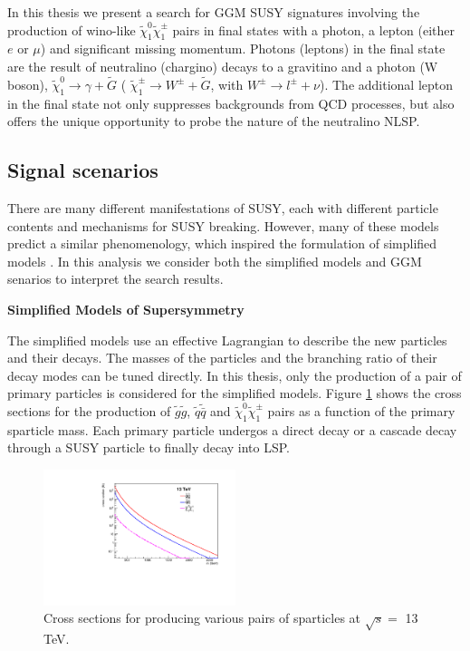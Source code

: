 \documentclass[thesis.tex]{subfiles}
\begin{document}
In this thesis we present a search for GGM SUSY signatures involving the production of wino-like $\tilde{\chi}_1^0\tilde{\chi}_1^\pm$ pairs in final states with a photon, a lepton (either $e$ or $\mu$) and significant missing momentum. 
Photons (leptons) in the final state are the result of neutralino (chargino) decays to a gravitino and a photon (W boson), $\tilde{\chi}_1^0 \rightarrow \gamma + \tilde{G}$ ( $\tilde{\chi}_1^\pm \rightarrow W^\pm+ \tilde{G}$, with $W^\pm \rightarrow l^\pm + \nu$).
The additional lepton in the final state not only suppresses backgrounds from QCD processes, but also offers the unique opportunity to probe the nature of the neutralino NLSP.  

\subsection{Signal scenarios}
There are many different manifestations of SUSY, each with different particle contents and mechanisms for SUSY breaking. 
However, many of these models predict a similar phenomenology, which inspired the formulation of simplified models \cite{SimplifiedModel}.
In this analysis we consider both the simplified models and GGM senarios to interpret the search results. 

\noindent \textbf{Simplified Models of Supersymmetry}

The simplified models use an effective Lagrangian to describe the new particles and their decays. 
The masses of the particles and the branching ratio of their decay modes can be tuned directly. 
In this thesis, only the production of a pair of primary particles is considered for the simplified models. 
Figure \ref{fig:crosssection} shows the cross sections for the production of $\tilde{g}\tilde{g}$, $\tilde{q}\tilde{\bar{q}}$ and $\tilde{\chi}_1^0\tilde{\chi}_1^\pm$ pairs as a function of the primary sparticle mass. 
Each primary particle undergos a direct decay or a cascade decay through a SUSY particle to finally decay into LSP. 

	\begin{figure}[!h]
		\centering
		\includegraphics[width=0.5\textwidth]{plot/xs_thesis.pdf}
		\caption{Cross sections for producing various pairs of sparticles at $\sqrt{s} =$ 13 TeV.} 
		\label{fig:crosssection}
	\end{figure}
\end{document}
